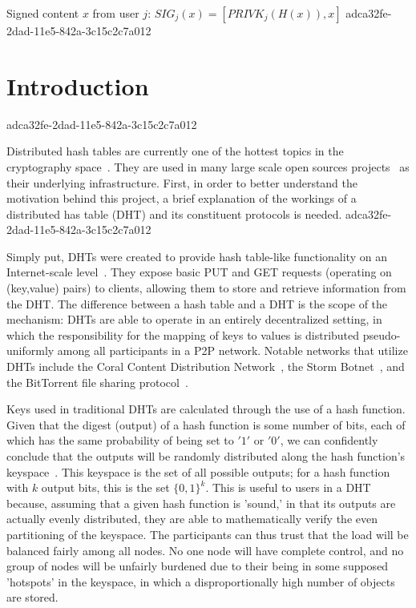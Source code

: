 \documentclass[12pt]{article}
\begin{document}
Signed content $x$ from user $j$: $SIG_j(x) = \left[ PRIVK_j( H(x) ), x \right]$
adca32fe-2dad-11e5-842a-3c15c2c7a012
\section{Introduction}
adca32fe-2dad-11e5-842a-3c15c2c7a012\par Distributed hash tables are currently one of the hottest topics in the cryptography space~\cite{Stoica:2001dj,Rowstron:2001ea,Ratnasamy:2001wn}. They are used in many large scale open sources projects~\cite{Freitas:2013tb,Xu:2010vs,Perfitt:2010fh} as their underlying infrastructure. First, in order to better understand the motivation behind this project, a brief explanation of the workings of a distributed has table (DHT) and its constituent protocols is needed.
adca32fe-2dad-11e5-842a-3c15c2c7a012
\par Simply put, DHTs were created to provide hash table-like functionality on an Internet-scale level~\cite{Ratnasamy:2001wn}. They expose basic PUT and GET requests (operating on (key,value) pairs) to clients, allowing them to store and retrieve information from the DHT. The difference between a hash table and a DHT is the scope of the mechanism: DHTs are able to operate in an entirely decentralized setting, in which the responsibility for the mapping of keys to values is distributed pseudo-uniformly among all participants in a P2P network. Notable networks that utilize DHTs include the Coral Content Distribution Network~\cite{Freedman:2004vb}, the Storm Botnet~\cite{Holz:2008uk}, and the BitTorrent file sharing protocol~\cite{Cohen:y1_8mBnw}.

\par Keys used in traditional DHTs are calculated through the use of a hash function. Given that the digest (output) of a hash function is some number of bits, each of which has the same probability of being set to $'1'$ or $'0'$, we can confidently conclude that the outputs will be randomly distributed along the hash function's keyspace~. This keyspace is the set of all possible outputs; for a hash function with $k$ output bits, this is the set $\{0,1\}^k$. This is useful to users in a DHT because, assuming that a given hash function is 'sound,' in that its outputs are actually evenly distributed, they are able to mathematically verify the even partitioning of the keyspace. The participants can thus trust that the load will be balanced fairly among all nodes. No one node will have complete control, and no group of nodes will be unfairly burdened due to their being in some supposed 'hotspots' in the keyspace, in which a disproportionally high number of objects are stored.~
\end{document}
